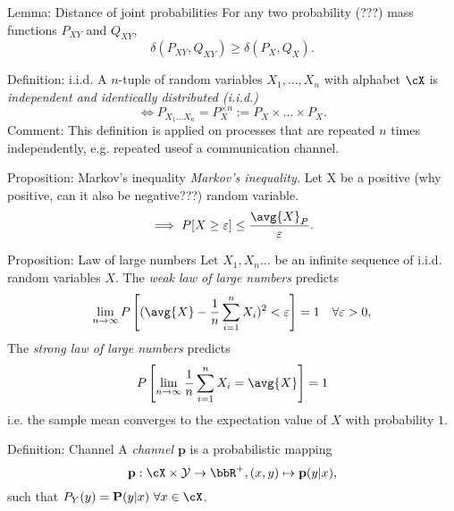 \documentclass[
			print,
			a6paper,
			grid=none]{kartei}
\begin{document}
\begin{karte}{Lemma: Distance of joint probabilities}
	For any two probability (???) mass functions $P_{XY}$ and $Q_{XY}$,
	\begin{equation*}
		\delta(P_{XY},Q_{XY}) \geq \delta(P_X,Q_X).
	\end{equation*}
\end{karte}

\begin{karte}{Definition: i.i.d.}
	A $n$-tuple of random variables $X_1,\dots,X_n$ with alphabet $\cX$ is \emph{independent and identically distributed (i.i.d.)}  
	\begin{equation*}
		\iff P_{X_1\dots X_n} = P_X^{\times n} := P_X \times\dots\times P_X.
	\end{equation*}
	Comment: This definition is applied on processes that are repeated $n$ times independently, e.g. repeated useof a communication channel.
\end{karte}

\begin{karte}{Proposition: Markov's inequality}
	\emph{Markov's inequality.} Let X be a positive (why positive, can it also be negative???) random variable.
	\begin{equation*}
		\implies P[X\geq\varepsilon] \leq \frac{\avg{X}_P}{\varepsilon}.
	\end{equation*}
\end{karte}

\begin{karte}{Proposition: Law of large numbers}
	Let $X_1, X_n\dots$ be an infinite sequence of i.i.d. random variables $X$. The \emph{weak law of large numbers} predicts
	\begin{equation*}
		\lim_{n\to\infty} P\left[ (\avg{X} - \frac{1}{n}\sum_{i=1}^n X_i)^2 < \varepsilon \right] = 1 \quad \forall \varepsilon>0,
	\end{equation*}
	The \emph{strong law of large numbers} predicts
	\begin{equation*}
		P\left[ \lim_{n\to\infty}\frac{1}{n}\sum_{i=1}^n X_i = \avg{X} \right] = 1
	\end{equation*}
	i.e. the sample mean converges to the expectation value of $X$ with probability $1$.
\end{karte}

\begin{karte}{Definition: Channel}
	A \emph{channel $\mathbf{p}$} is a probabilistic mapping 
	\begin{equation*}
		\mathbf{p}: \cX\times\mathcal{Y}\to\bbR^+, (x,y)\mapsto\mathbf{p}(y\vert x),
	\end{equation*}
	such that $P_Y(y)=\mathbf{P}(y\vert x) ~\forall x\in\cX$.
\end{karte}
\end{document}
